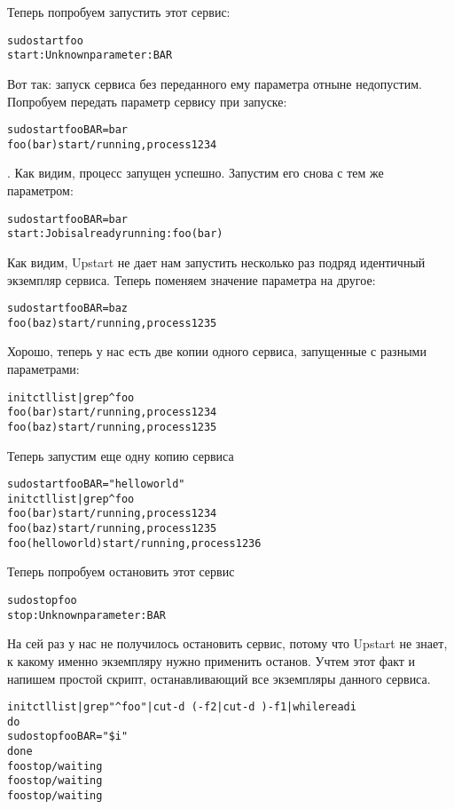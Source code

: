 Теперь попробуем запустить этот сервис: \begin{alltt}
sudo start foo
start: Unknown parameter: BAR
\end{alltt} Вот так: запуск сервиса без переданного ему параметра отныне недопустим. Попробуем передать параметр сервису при запуске: \begin{alltt}
sudo start foo BAR=bar
foo (bar) start/running, process 1234
\end{alltt}. Как видим, процесс запущен успешно. Запустим его снова с тем же параметром: \begin{alltt}
sudo start foo BAR=bar
start: Job is already running: foo (bar)
\end{alltt}
Как видим, Upstart не дает нам запустить несколько раз подряд идентичный экземпляр сервиса. Теперь поменяем значение параметра на другое: \begin{alltt}
sudo start foo BAR=baz
foo (baz) start/running, process 1235
\end{alltt} Хорошо, теперь у нас есть две копии одного сервиса, запущенные с разными параметрами: \begin{alltt}
initctl list | grep ^foo
foo (bar) start/running, process 1234
foo (baz) start/running, process 1235
\end{alltt} Теперь запустим еще одну копию сервиса \begin{alltt}
sudo start foo BAR="hello world"
initctl list | grep ^foo
foo (bar) start/running, process 1234
foo (baz) start/running, process 1235
foo (hello world) start/running, process 1236
\end{alltt} Теперь попробуем остановить этот сервис \begin{alltt}
sudo stop foo
stop: Unknown parameter: BAR
\end{alltt} На сей раз у нас не получилось остановить сервис, потому что Upstart не знает, к какому именно экземпляру нужно применить останов. Учтем этот факт и напишем простой скрипт, останавливающий все экземпляры данного сервиса. \begin{alltt}
initctl list | grep "^foo " | cut -d\ ( -f2 | cut -d\ ) -f1 | while read i
do
sudo stop foo BAR="\$i"
done
foo stop/waiting
foo stop/waiting
foo stop/waiting
\end{alltt}
